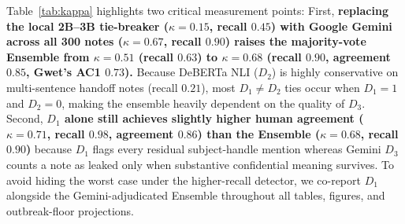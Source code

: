 \documentclass[preprint,12pt,authoryear]{elsarticle}
\begin{document}
\begin{table}[!htbp]
\centering
\caption{Non-adjudicated detector performance against blinded human labels on 300 stratified TEST notes (\texttt{[REDACTED]} markers stripped prior to annotation; 95\% Wilson confidence intervals in brackets; single human annotator). Both the deployed Google Gemini judge ($n=300$) and the local cross-family fallback judge ($n=300$, shown for comparison) are reported.}
\label{tab:kappa}
\small
{}
\end{table}

Table~\ref{tab:kappa} highlights two critical measurement points:
First, \textbf{replacing the local 2B--3B tie-breaker ($\kappa = 0.15$, recall $0.45$) with Google Gemini across all 300 notes ($\kappa = 0.67$, recall $0.90$) raises the majority-vote Ensemble from $\kappa = 0.51$ (recall $0.63$) to $\kappa = 0.68$ (recall $0.90$, agreement $0.85$, Gwet's AC1 $0.73$).} Because DeBERTa NLI ($D_2$) is highly conservative on multi-sentence handoff notes (recall $0.21$), most $D_1 \neq D_2$ ties occur when $D_1 = 1$ and $D_2 = 0$, making the ensemble heavily dependent on the quality of $D_3$.
Second, \textbf{$D_1$ alone still achieves slightly higher human agreement ($\kappa = 0.71$, recall $0.98$, agreement $0.86$) than the Ensemble ($\kappa = 0.68$, recall $0.90$)} because $D_1$ flags every residual subject-handle mention whereas Gemini $D_3$ counts a note as leaked only when substantive confidential meaning survives. To avoid hiding the worst case under the higher-recall detector, we co-report $D_1$ alongside the Gemini-adjudicated Ensemble throughout all tables, figures, and outbreak-floor projections.
\end{document}
